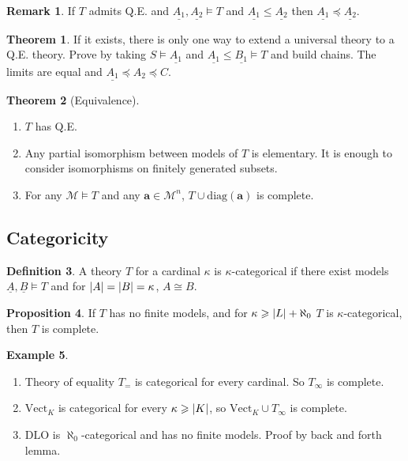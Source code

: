 \documentclass[a4paper,10pt]{article}
\theoremstyle{definition}
\newtheorem{theorem}{Theorem}
\newtheorem*{remark}{Remark}
\DeclarePairedDelimiter\abs{\lvert}{\rvert}
\newtheorem{definition}[theorem]{Definition}
\newtheorem{example}[theorem]{Example}
\newtheorem{proposition}[theorem]{Proposition}
\let\vec\mathbf
\begin{document}
\begin{remark}
    If $T$ admits Q.E. and $\underline{A_1},\underline{A_2} \models T$ and $ \underline{A_1} \leqslant \underline{A_2}$ then $\underline{A_1} \preceq \underline{A_2}$.
\end{remark}

\begin{theorem}
    If it exists, there is only one way to extend a universal theory to a Q.E. theory. Prove by taking $S \models \underline{A_1}$ and $\underline{A_1} \leqslant \underline{B_1} \models T$ and build chains. The limits are equal and $\underline{A_1} \preceq A_2 \preceq C$.
\end{theorem}

\begin{theorem}[Equivalence]
    \begin{enumerate}
        \item $T$ has Q.E.
        \item Any partial isomorphism between models of $T$ is elementary. It is enough to consider isomorphisms on finitely generated subsets.
        \item For any $\mathcal{M} \models T$ and any $\vec{a} \in \mathcal{M}^n$, $T \cup \mathrm{diag}(\vec{a})$ is complete.
    \end{enumerate}
\end{theorem}

\subsection*{Categoricity}

\begin{definition}
    A theory $T$ for a cardinal $\kappa$ is $\kappa$-categorical if there exist models $\underline{A}, \underline{B} \models T$ and for $\abs{A} = \abs{B} = \kappa$, $A \cong B$.
\end{definition}

\begin{proposition}
    If $T$ has no finite models, and for $\kappa \geqslant \abs{L} + \aleph_0$ $T$ is $\kappa$-categorical, then $T$ is complete.
\end{proposition}


\begin{example}
    \begin{enumerate}
        \item Theory of equality $T_=$ is categorical for every cardinal. So $T_{\infty}$ is complete.
        \item $\mathrm{Vect}_K$ is categorical for every $\kappa \geqslant \abs{K}$, so $\mathrm{Vect}_K \cup T_\infty$ is complete.
        \item $\mathrm{DLO}$ is $\aleph_0$-categorical and has no finite models. Proof by back and forth lemma.
    \end{enumerate}
\end{example}
\end{document}
